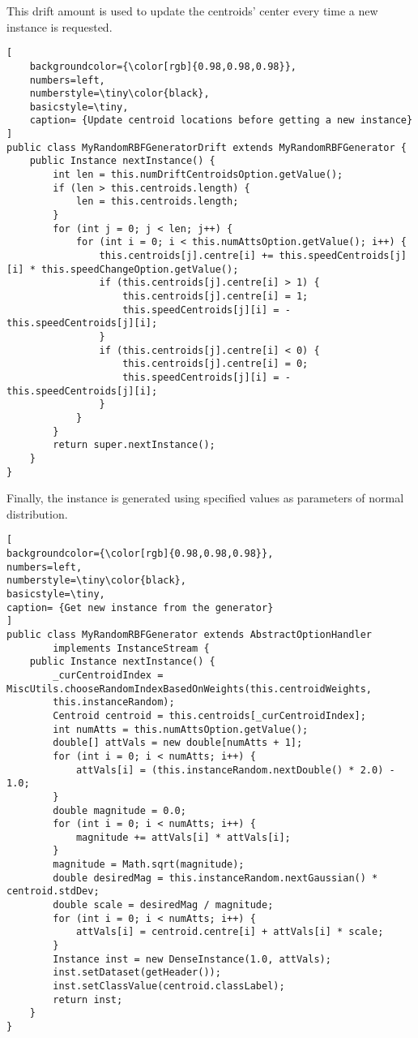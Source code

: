 This drift amount is used to update the centroids' center every time a new instance is requested. 
\begin{lstlisting}[
    backgroundcolor={\color[rgb]{0.98,0.98,0.98}},
    numbers=left,
    numberstyle=\tiny\color{black},
    basicstyle=\tiny,
    caption= {Update centroid locations before getting a new instance}
]
public class MyRandomRBFGeneratorDrift extends MyRandomRBFGenerator {
    public Instance nextInstance() {
        int len = this.numDriftCentroidsOption.getValue();
        if (len > this.centroids.length) {
            len = this.centroids.length;
        }
        for (int j = 0; j < len; j++) {
            for (int i = 0; i < this.numAttsOption.getValue(); i++) {
                this.centroids[j].centre[i] += this.speedCentroids[j][i] * this.speedChangeOption.getValue();
                if (this.centroids[j].centre[i] > 1) {
                    this.centroids[j].centre[i] = 1;
                    this.speedCentroids[j][i] = -this.speedCentroids[j][i];
                }
                if (this.centroids[j].centre[i] < 0) {
                    this.centroids[j].centre[i] = 0;
                    this.speedCentroids[j][i] = -this.speedCentroids[j][i];
                }
            }
        }
        return super.nextInstance();
    }
}
\end{lstlisting}
Finally, the instance is generated using specified values as parameters of normal distribution.
\begin{lstlisting}[
backgroundcolor={\color[rgb]{0.98,0.98,0.98}},
numbers=left,
numberstyle=\tiny\color{black},
basicstyle=\tiny,
caption= {Get new instance from the generator}
]
public class MyRandomRBFGenerator extends AbstractOptionHandler 
        implements InstanceStream {
    public Instance nextInstance() {
        _curCentroidIndex = MiscUtils.chooseRandomIndexBasedOnWeights(this.centroidWeights,
        this.instanceRandom);
        Centroid centroid = this.centroids[_curCentroidIndex];
        int numAtts = this.numAttsOption.getValue();
        double[] attVals = new double[numAtts + 1];
        for (int i = 0; i < numAtts; i++) {
            attVals[i] = (this.instanceRandom.nextDouble() * 2.0) - 1.0;
        }
        double magnitude = 0.0;
        for (int i = 0; i < numAtts; i++) {
            magnitude += attVals[i] * attVals[i];
        }
        magnitude = Math.sqrt(magnitude);
        double desiredMag = this.instanceRandom.nextGaussian() * centroid.stdDev;
        double scale = desiredMag / magnitude;
        for (int i = 0; i < numAtts; i++) {
            attVals[i] = centroid.centre[i] + attVals[i] * scale;
        }
        Instance inst = new DenseInstance(1.0, attVals);
        inst.setDataset(getHeader());
        inst.setClassValue(centroid.classLabel);
        return inst;
    }
}
\end{lstlisting}

